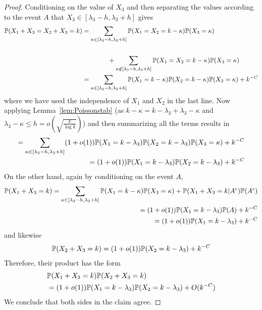 \begin{appendices}
\begin{proof}
Conditioning on the value of $X_3$ and then separating the values according to the event $A$ that $X_3 \in [\lambda_3-h,\lambda_3 +h]$ gives
\begin{align*}
\mathbb{P}( X_1+X_3 = X_2 + X_3 =k) &= \sum_{\kappa \in [\lambda_3-h,\lambda_3+h]} \mathbb{P}(X_1=X_2=k-\kappa)\mathbb{P}(X_3=\kappa) \\
 \\ &\qquad \qquad+ \sum_{\kappa \not \in [\lambda_3-h,\lambda_3+h]} \mathbb{P}(X_1=X_2=k-\kappa)\mathbb{P}(X_3=\kappa) \\
&=\sum_{\kappa \in [\lambda_3-h,\lambda_3+h]} \mathbb{P}(X_1=k-\kappa)\mathbb{P}(X_2=k-\kappa)\mathbb{P}(X_3=\kappa) + k^{-C}
\end{align*}
where we have used the independence of $X_1$ and $X_2$ in the last line. Now applying Lemma~\ref{lem:Poissonstab} (as $k-\kappa = k-\lambda_3+\lambda_3-\kappa$ and $\lambda_3-\kappa \leq h = o(\sqrt{\frac{k}{\log k}})$) and then summarizing all the terms results in
\begin{align*}
=\sum_{\kappa \in [\lambda_3-h,\lambda_3+h]} (1+o(1))\mathbb{P}(X_1=k-\lambda_3)\mathbb{P}(X_2=k-\lambda_3)\mathbb{P}(X_3=\kappa) +k^{-C} \\
= (1+o(1)) \mathbb{P}( X_1 =k- \lambda_3 ) \mathbb{P}(  X_2 = k-\lambda_3) +k^{-C}
\end{align*}
On the other hand, again by conditioning on the event $A$,
\begin{align*}
\mathbb{P}(X_1+X_3=k) = \sum_{\kappa \in [\lambda_3-h,\lambda_3+h]} \mathbb{P}(X_1=k-\kappa)\mathbb{P}(X_3 = \kappa)+\mathbb{P}(X_1+X_3=k|A^c)\mathbb{P}(A^c)\\
 = (1+o(1))\mathbb{P}(X_1=k- \lambda_3)\mathbb{P}(A) +k^{-C} \\
 =(1+o(1))\mathbb{P}(X_1=k-\lambda_3)+k^{-C}
\end{align*}
and likewise
\begin{align*}
\mathbb{P}(X_2+X_3=k)
 = (1+o(1))\mathbb{P}(X_2=k- \lambda_3) +k^{-C}
\end{align*}
Therefore, their product has the form
\begin{align*}
&\mathbb{P}(X_1+X_3=k)\mathbb{P}(X_2+X_3=k) \\
&= (1+o(1))\mathbb{P}(X_1=k-\lambda_3)\mathbb{P}(X_2=k-\lambda_3)+O(k^{-C})
\end{align*}
We conclude that both sides in the claim agree.
\end{proof}
\end{appendices}
